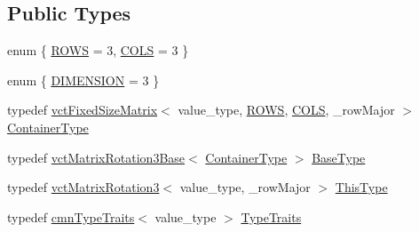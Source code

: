 \subsection*{Public Types}
\begin{DoxyCompactItemize}
\item 
enum \{ \hyperlink{group__cisst_vector_ggac08ca99a9ddb4e59a896f765b4ae95bfa2e2c8802539f04eff93b4598b1fbb362}{R\+O\+W\+S} = 3, 
\hyperlink{group__cisst_vector_ggac08ca99a9ddb4e59a896f765b4ae95bfa8c935a63b595f6c48177e1213c36f787}{C\+O\+L\+S} = 3
 \}
\item 
enum \{ \hyperlink{group__cisst_vector_ggaa21ad8fcafb1ab9d70efcec9bda6eab2af25ebbcafe4db62f894c21db0608cd65}{D\+I\+M\+E\+N\+S\+I\+O\+N} = 3
 \}
\item 
typedef \hyperlink{classvct_fixed_size_matrix}{vct\+Fixed\+Size\+Matrix}$<$ value\+\_\+type, \hyperlink{group__cisst_vector_ggac08ca99a9ddb4e59a896f765b4ae95bfa2e2c8802539f04eff93b4598b1fbb362}{R\+O\+W\+S}, \hyperlink{group__cisst_vector_ggac08ca99a9ddb4e59a896f765b4ae95bfa8c935a63b595f6c48177e1213c36f787}{C\+O\+L\+S}, \+\_\+row\+Major $>$ \hyperlink{classvct_matrix_rotation3_a1f8796d5368dbda35c3b57c6395b6dd0}{Container\+Type}
\item 
typedef \hyperlink{classvct_matrix_rotation3_base}{vct\+Matrix\+Rotation3\+Base}$<$ \hyperlink{classvct_matrix_rotation3_a1f8796d5368dbda35c3b57c6395b6dd0}{Container\+Type} $>$ \hyperlink{classvct_matrix_rotation3_a548c9a746fae0bfb7b4b1466a872f4dd}{Base\+Type}
\item 
typedef \hyperlink{classvct_matrix_rotation3}{vct\+Matrix\+Rotation3}$<$ value\+\_\+type, \+\_\+row\+Major $>$ \hyperlink{classvct_matrix_rotation3_adb3687819aa485dec149239047be7c50}{This\+Type}
\item 
typedef \hyperlink{classcmn_type_traits}{cmn\+Type\+Traits}$<$ value\+\_\+type $>$ \hyperlink{classvct_matrix_rotation3_a17e78ff6b4b66abf1f301c136652e503}{Type\+Traits}
\end{DoxyCompactItemize}
